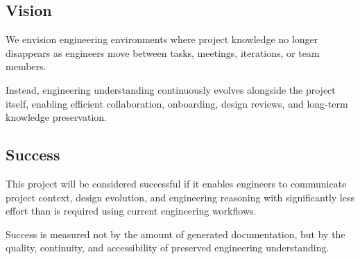 \vspace{0.5cm}

\subsection{Vision}

We envision engineering environments where project knowledge no longer disappears as engineers move between tasks, meetings, iterations, or team members.

Instead, engineering understanding continuously evolves alongside the project itself, enabling efficient collaboration, onboarding, design reviews, and long-term knowledge preservation.

\vspace{0.5cm}

\subsection{Success}

This project will be considered successful if it enables engineers to communicate project context, design evolution, and engineering reasoning with significantly less effort than is required using current engineering workflows.

Success is measured not by the amount of generated documentation, but by the quality, continuity, and accessibility of preserved engineering understanding.